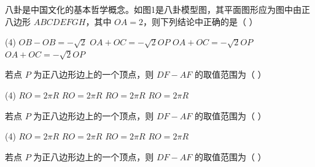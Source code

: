 \begin{example}
    八卦是中国文化的基本哲学概念。如图1是八卦模型图，其平面图形应为图中由正八边形 \( ABCDEFGH \)，其中 \( OA = 2 \)，则下列结论中正确的是（ ）
    \begin{tasks}(4)
        \task \( OB - OB = -\sqrt{2} \)
        \task \( OA + OC = -\sqrt{2} OP \)
        \task \( OA + OC = -\sqrt{2} OP \)
        \task \( OA + OC = -\sqrt{2} OP \)
    \end{tasks}
\end{example}

\begin{example}
    若点 \( P \) 为正八边形边上的一个顶点，则 \( DF - AF \) 的取值范围为（ ）
    \begin{tasks}(4)
        \task \( RO = 2\pi R \)
        \task \( RO = 2\pi R \)
        \task \( RO = 2\pi R \)
        \task \( RO = 2\pi R \)
    \end{tasks}
\end{example}

\begin{example}
    若点 \( P \) 为正八边形边上的一个顶点，则 \( DF - AF \) 的取值范围为（ ）
    \begin{tasks}(4)
        \task \( RO = 2\pi R \)
        \task \( RO = 2\pi R \)
        \task \( RO = 2\pi R \)
        \task \( RO = 2\pi R \)
    \end{tasks}
\end{example}

\begin{example}
    若点 \( P \) 为正八边形边上的一个顶点，则 \( DF - AF \) 的取值范围为（ ）
\end{example}